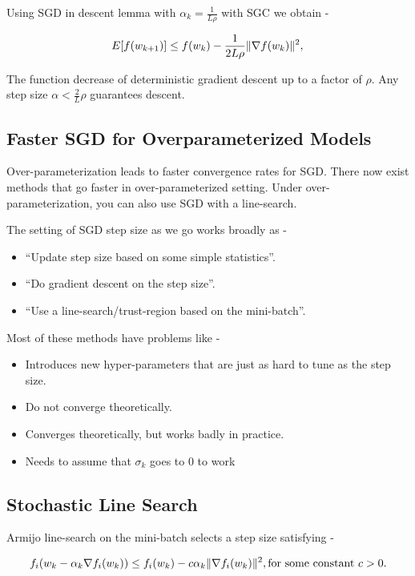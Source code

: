 \documentclass[
]{article}
\begin{document}
Using SGD in descent lemma with \(\alpha_k = \frac{1}{L\rho}\) with SGC we obtain -

\[
E[f(w_{k+1})] \leq f(w_k) - \frac{1}{2L\rho} \|\nabla f(w_k)\|^2, \\
\]

The function decrease of deterministic gradient descent up to a factor of \(\rho\). Any step size \(\alpha < \frac{2}{L}\rho\) guarantees descent.

\subsection{Faster SGD for Overparameterized Models}\label{faster-sgd-for-overparameterized-models}

Over-parameterization leads to faster convergence rates for SGD. There now exist methods that go faster in over-parameterized setting. Under over-parameterization, you can also use SGD with a line-search.

The setting of SGD step size as we go works broadly as -

\begin{itemize}
\item
  ``Update step size based on some simple statistics''.
\item
  ``Do gradient descent on the step size''.
\item
  ``Use a line-search/trust-region based on the mini-batch''.
\end{itemize}

Most of these methods have problems like -

\begin{itemize}
\item
  Introduces new hyper-parameters that are just as hard to tune as the step size.
\item
  Do not converge theoretically.
\item
  Converges theoretically, but works badly in practice.
\item
  Needs to assume that \(\sigma_k\) goes to 0 to work
\end{itemize}

\subsection{Stochastic Line Search}\label{stochastic-line-search}

Armijo line-search on the mini-batch selects a step size satisfying -

\[
f_i(w_k - \alpha_k \nabla f_i(w_k)) \leq f_i(w_k) - c \alpha_k \|\nabla f_i(w_k)\|^2, 
\text{for some constant } c > 0. \\
\text{}
\]
\end{document}
